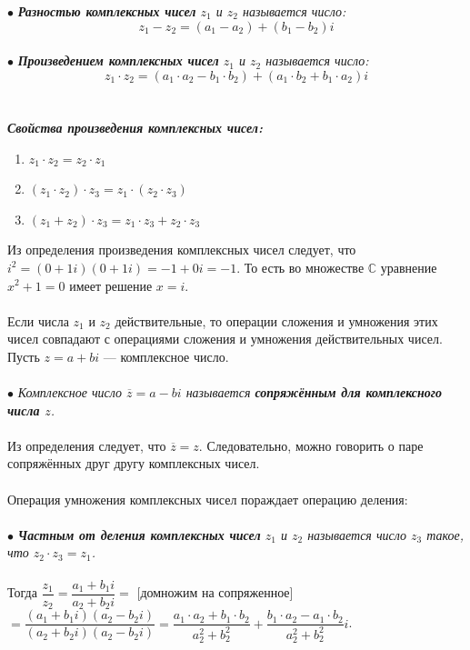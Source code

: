 $\bullet$ \textit{\textbf{Разностью комплексных чисел} $z_1$ и $z_2$ называется число: $$z_1 - z_2 = (a_1 - a_2) + (b_1 - b_2) i$$ }\\
$\bullet$ \textit{\textbf{Произведением комплексных чисел} $z_1$ и $z_2$ называется число: $$z_1 \cdot z_2 = (a_1 \cdot a_2 - b_1 \cdot b_2) + (a_1 \cdot b_2 + b_1 \cdot a_2) i$$ }\\\\
\textbf{\textit{Свойства произведения комплексных чисел:}}\begin{enumerate}
	\item $z_1\cdot z_2 = z_2\cdot z_1$
	\item $(z_1\cdot z_2)\cdot z_3 = z_1\cdot (z_2\cdot z_3)$
	\item $(z_1 + z_2)\cdot z_3 = z_1\cdot z_3 + z_2 \cdot z_3$
\end{enumerate}
Из определения произведения комплексных чисел следует, что $i^2 = (0 + 1i)(0+1i) = -1 + 0i = -1$. То есть во множестве $\mathbb{C}$ уравнение $x^2 + 1 = 0$ имеет решение $x = i$.\\\\
Если числа $z_1$ и $z_2$ действительные, то операции сложения и умножения этих чисел совпадают с операциями сложения и умножения действительных чисел.\\
Пусть $z = a+ bi$ --- комплексное число.\\\\
$\bullet$ \textit{Комплексное число $\overline{z} = a - bi$ называется \textbf{сопряжённым для комплексного числа $z$}.}\\\\
Из определения следует, что $\overline{z} = z$. Следовательно, можно говорить о паре сопряжённых друг другу комплексных чисел.\\\\
Операция умножения комплексных чисел пораждает операцию деления:\\\\
$\bullet$ \textit{\textbf{Частным от деления комплексных чисел} $z_1$ и $z_2$ называется число $z_3$ такое, что $z_2 \cdot z_3 = z_1$. }\\\\
Тогда $\dfrac{z_1}{z_2} = \dfrac{a_1 + b_1 i}{a_2 + b_2 i} =$ [домножим на сопряженное] $= \dfrac{(a_1 + b_1 i)(a_2 - b_2 i)}{(a_2 + b_2 i)(a_2 - b_2 i)}= \dfrac{a_1\cdot a_2 + b_1 \cdot b_2}{a_2^2 + b_2 ^ 2} + \dfrac{b_1 \cdot a_2 - a_1 \cdot b_2}{a_2^2 + b_2^2}i$.\\\\
